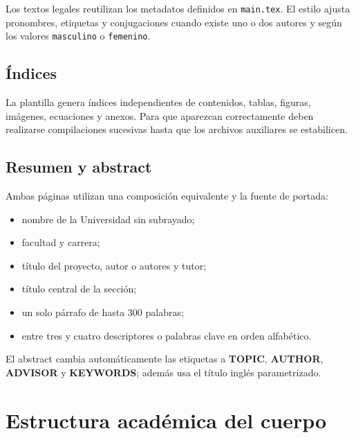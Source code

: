 \documentclass[12pt,a4paper,oneside]{report}
\begin{document}
Los textos legales reutilizan los metadatos definidos en \texttt{main.tex}. El estilo ajusta pronombres, etiquetas y conjugaciones cuando existe uno o dos autores y según los valores \texttt{masculino} o \texttt{femenino}.

\section{Índices}

La plantilla genera índices independientes de contenidos, tablas, figuras, imágenes, ecuaciones y anexos. Para que aparezcan correctamente deben realizarse compilaciones sucesivas hasta que los archivos auxiliares se estabilicen.

\section{Resumen y abstract}

Ambas páginas utilizan una composición equivalente y la fuente de portada:

\begin{itemize}
  \item nombre de la Universidad sin subrayado;
  \item facultad y carrera;
  \item título del proyecto, autor o autores y tutor;
  \item título central de la sección;
  \item un solo párrafo de hasta 300 palabras;
  \item entre tres y cuatro descriptores o palabras clave en orden alfabético.
\end{itemize}

El abstract cambia automáticamente las etiquetas a \textbf{TOPIC}, \textbf{AUTHOR}, \textbf{ADVISOR} y \textbf{KEYWORDS}; además usa el título inglés parametrizado.

\chapter{Estructura académica del cuerpo}
\end{document}

